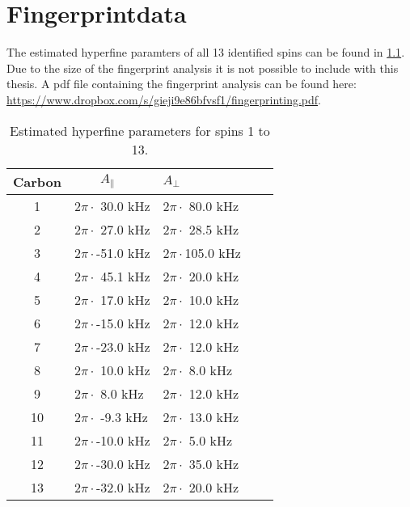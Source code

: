 \chapter{Fingerprintdata}
\label{chap:Fingerprint_data_appendix}
The estimated hyperfine paramters of all 13 identified spins can be found in \cref{tbl:HF_par_appendix}. Due to the size of the fingerprint analysis it is not possible to include with this thesis. A pdf file containing the fingerprint analysis can be found here: \url{https://www.dropbox.com/s/gieji9e86bfvsf1/fingerprinting.pdf}.

\begin{table}[htbp]
    \begin{tabular}{cllll}

    Carbon &  $\quad \quad A_{\parallel} $ &\quad \quad  $A_{\perp}$ \\ \hline
    1 & 2$\pi \cdot ${ }30.0 kHz & 2$\pi \cdot ${ }80.0 kHz \\
    2 & 2$\pi \cdot ${ }27.0 kHz & 2$\pi \cdot ${ }28.5 kHz \\
    3 & 2$\pi \cdot $-51.0 kHz & 2$\pi \cdot $105.0 kHz \\
    4 & 2$\pi \cdot ${ }45.1 kHz & 2$\pi \cdot ${ }20.0 kHz \\
    5 & 2$\pi \cdot ${ }17.0 kHz & 2$\pi \cdot ${ }10.0 kHz \\
    6 & 2$\pi \cdot $-15.0 kHz & 2$\pi \cdot ${ }12.0 kHz \\
    7 & 2$\pi \cdot $-23.0 kHz & 2$\pi \cdot ${ }12.0 kHz \\
    8 & 2$\pi \cdot ${ }10.0 kHz & 2$\pi \cdot ${ }{ }8.0 kHz \\
    9 & 2$\pi \cdot ${ }{ }8.0 kHz & 2$\pi \cdot ${ }12.0 kHz \\
    10 & 2$\pi \cdot ${ }-9.3 kHz & 2$\pi \cdot ${ }13.0 kHz \\
    11 & 2$\pi \cdot $-10.0 kHz & 2$\pi \cdot ${ }{ }5.0 kHz \\
    12 & 2$\pi \cdot $-30.0 kHz & 2$\pi \cdot ${ }35.0 kHz \\
    13 & 2$\pi \cdot $-32.0 kHz & 2$\pi \cdot ${ }20.0 kHz \\
    \end{tabular}
    \caption{Estimated hyperfine parameters for spins 1 to 13.}
    \label{tbl:HF_par_appendix}
\end{table}
